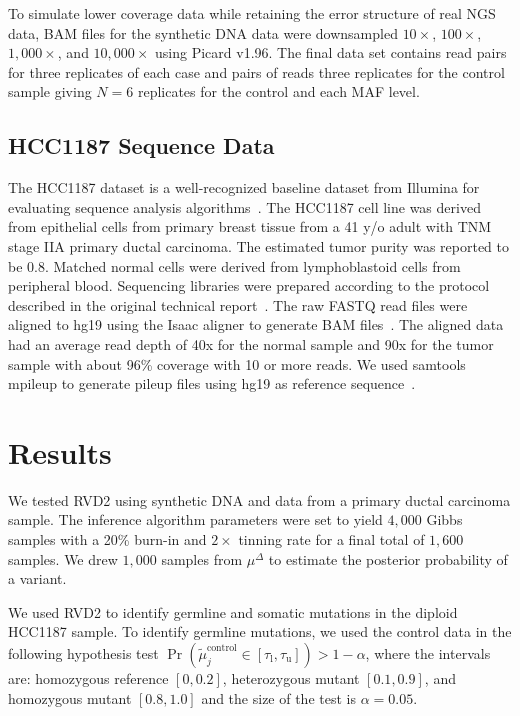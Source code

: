 \documentclass{bioinfo}
\begin{document}
To simulate lower coverage data while retaining the error structure of real NGS data, BAM files for the synthetic DNA data were downsampled $10\times$, $100\times$, $1,000\times$, and $10,000\times$ using Picard v1.96. The final data set contains read pairs for three replicates of each case and pairs of reads three replicates for the control sample giving $N=6$ replicates for the control and each MAF level.

\subsection{HCC1187 Sequence Data}

The HCC1187 dataset is a well-recognized baseline dataset from Illumina for evaluating sequence analysis algorithms~\citep{newman2013relative,howarth2011large,howarth2007array}. The HCC1187 cell line was derived from  epithelial cells from primary breast tissue from a 41 y/o adult with TNM stage IIA primary ductal carcinoma. The estimated tumor purity was reported to be 0.8. Matched normal cells were derived from lymphoblastoid cells from peripheral blood. Sequencing libraries were prepared according to the protocol described in the original technical report~\citep{hcc1187techreport}. The raw FASTQ read files were aligned to hg19 using the Isaac aligner to generate BAM files~\citep{raczy2013isaac}. The aligned data had an average read depth of 40x for the normal sample and 90x for the tumor sample with about 96\% coverage with 10 or more reads. We used samtools mpileup to generate pileup files using hg19 as reference sequence~\citep{Navin:2010gu}.


\section{Results}


We tested RVD2 using synthetic DNA and data from a primary ductal carcinoma sample. The inference algorithm parameters were set to yield $4,000$ Gibbs samples with a 20\% burn-in and $2\times$ tinning rate for a final total of $1,600$ samples. We drew $1,000$ samples from $\mu^{\Delta}$ to estimate the posterior probability of a variant.

We used RVD2 to identify germline and somatic mutations in the diploid HCC1187 sample. To identify germline mutations, we used the control data in the following hypothesis test $\Pr( \tilde{\mu}_j^{\text{control}} \in [\tau_\text{l},\tau_\text{u}] ) > 1-\alpha$, where the intervals are: homozygous reference $[0, 0.2]$, heterozygous mutant $[0.1, 0.9]$, and homozygous mutant $[0.8, 1.0]$ and the size of the test is $\alpha=0.05$.
\end{document}
